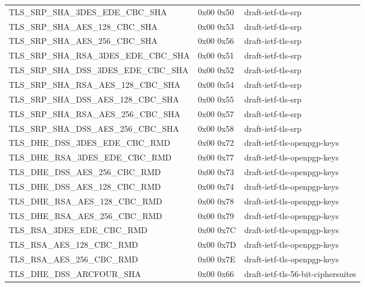 \begin{center}
\begin{supertabular}{|l|l|l|}
{\small{TLS\_SRP\_SHA\_3DES\_EDE\_CBC\_SHA}} & 0x00 0x50 & draft-ietf-tls-srp \\
{\small{TLS\_SRP\_SHA\_AES\_128\_CBC\_SHA}} & 0x00 0x53 & draft-ietf-tls-srp \\
{\small{TLS\_SRP\_SHA\_AES\_256\_CBC\_SHA}} & 0x00 0x56 & draft-ietf-tls-srp \\
{\small{TLS\_SRP\_SHA\_RSA\_3DES\_EDE\_CBC\_SHA}} & 0x00 0x51 & draft-ietf-tls-srp \\
{\small{TLS\_SRP\_SHA\_DSS\_3DES\_EDE\_CBC\_SHA}} & 0x00 0x52 & draft-ietf-tls-srp \\
{\small{TLS\_SRP\_SHA\_RSA\_AES\_128\_CBC\_SHA}} & 0x00 0x54 & draft-ietf-tls-srp \\
{\small{TLS\_SRP\_SHA\_DSS\_AES\_128\_CBC\_SHA}} & 0x00 0x55 & draft-ietf-tls-srp \\
{\small{TLS\_SRP\_SHA\_RSA\_AES\_256\_CBC\_SHA}} & 0x00 0x57 & draft-ietf-tls-srp \\
{\small{TLS\_SRP\_SHA\_DSS\_AES\_256\_CBC\_SHA}} & 0x00 0x58 & draft-ietf-tls-srp \\

{\small{TLS\_DHE\_DSS\_3DES\_EDE\_CBC\_RMD}} & 0x00 0x72 & draft-ietf-tls-openpgp-keys \\
{\small{TLS\_DHE\_RSA\_3DES\_EDE\_CBC\_RMD}} & 0x00 0x77 & draft-ietf-tls-openpgp-keys \\
{\small{TLS\_DHE\_DSS\_AES\_256\_CBC\_RMD}} & 0x00 0x73 & draft-ietf-tls-openpgp-keys \\
{\small{TLS\_DHE\_DSS\_AES\_128\_CBC\_RMD}} & 0x00 0x74 & draft-ietf-tls-openpgp-keys \\
{\small{TLS\_DHE\_RSA\_AES\_128\_CBC\_RMD}} & 0x00 0x78 & draft-ietf-tls-openpgp-keys \\
{\small{TLS\_DHE\_RSA\_AES\_256\_CBC\_RMD}} & 0x00 0x79 & draft-ietf-tls-openpgp-keys \\
{\small{TLS\_RSA\_3DES\_EDE\_CBC\_RMD}} & 0x00 0x7C & draft-ietf-tls-openpgp-keys \\
{\small{TLS\_RSA\_AES\_128\_CBC\_RMD}} & 0x00 0x7D & draft-ietf-tls-openpgp-keys \\
{\small{TLS\_RSA\_AES\_256\_CBC\_RMD}} & 0x00 0x7E & draft-ietf-tls-openpgp-keys \\

{\small{TLS\_DHE\_DSS\_ARCFOUR\_SHA}} & 0x00 0x66 & draft-ietf-tls-56-bit-ciphersuites \\

\end{supertabular}

\end{center}

